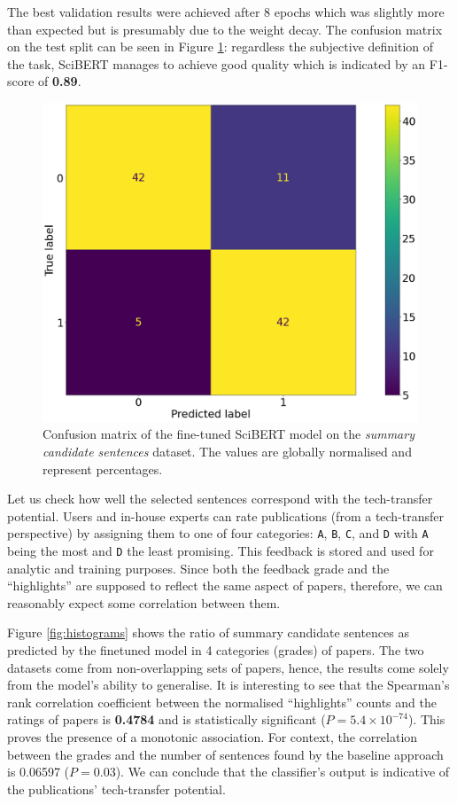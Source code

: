 The best validation results were achieved after 8 epochs which was slightly more than expected but is presumably due to the weight decay. The confusion matrix on the test split can be seen in Figure \ref{fig:scibert-confusion}: regardless the subjective definition of the task, SciBERT manages to achieve good quality which is indicated by an F1-score of \textbf{0.89}.

\begin{figure}
    \centering
    \includegraphics[width=0.4\linewidth]{figures/scibert-confusion.png}
    \captionsetup{width=.9\linewidth}
    \caption{Confusion matrix of the fine-tuned SciBERT model on the \textit{summary candidate sentences} dataset. The values are globally normalised and represent percentages.}
    \label{fig:scibert-confusion}
\end{figure}

Let us check how well the selected sentences correspond with the tech-transfer potential. Users and in-house experts can rate publications (from a tech-transfer perspective) by assigning them to one of four categories: \texttt{A}, \texttt{B}, \texttt{C}, and \texttt{D} with \texttt{A} being the most and \texttt{D} the least promising. This feedback is stored and used for analytic and training purposes. Since both the feedback grade and the ``highlights'' are supposed to reflect the same aspect of papers, therefore, we can reasonably expect some correlation between them.

Figure \ref{fig:histograms} shows the ratio of summary candidate sentences as predicted by the finetuned model in 4 categories (grades) of papers. The two datasets come from non-overlapping sets of papers, hence, the results come solely from the model's ability to generalise. It is interesting to see that the Spearman's rank correlation coefficient \cite{spearman1961proof} between the normalised ``highlights'' counts and the ratings of papers is \textbf{0.4784} and is statistically significant ($P = 5.4 \times 10^{-74}$). This proves the presence of a monotonic association. For context, the correlation between the grades and the number of sentences found by the baseline approach is 0.06597 ($P = 0.03$). We can conclude that the classifier's output is indicative of the publications' tech-transfer potential. 

